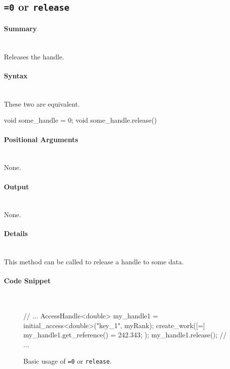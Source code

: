 \subsection{\texttt{=0} or \texttt{release}}

\paragraph{Summary} \mbox{}\\
Releases the handle.

\paragraph{Syntax} \mbox{}\\
These two are equivalent.
\begin{CppCode}
void some_handle = 0;    
void some_handle.release()
\end{CppCode}


\paragraph{Positional Arguments} \mbox{}\\
None.

\paragraph{Output} \mbox{}\\
None.

\paragraph{Details} \mbox{}\\
This method can be called to release a handle to some data.


\paragraph{Code Snippet} \mbox{}\\
\begin{figure}[!h]
\begin{CppCodeNumb}
// ...
AccessHandle<double> my_handle1 = initial_access<double>("key_1", myRank);
create_work([=]{
	my_handle1.get_reference() = 242.343;
});
my_handle1.release();
// ...
\end{CppCodeNumb}
\label{fig:fe_api_release}
\caption{Basic usage of \texttt{=0} or \texttt{release}.}
\end{figure}





